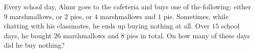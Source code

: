 Every school day, Alnur goes to the cafeteria and buys one of the following: either $9$ marshmallows, or $2$ pies, or $4$ marshmallows and $1$ pie. Sometimes, while chatting with his classmates, he ends up buying nothing at all. Over $15$ school days, he bought $26$ marshmallows and $8$ pies in total. On how many of these days did he buy nothing?
